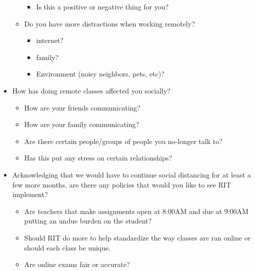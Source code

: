 \documentclass[12pt,
 reprint,
nofootinbib,
 amsmath,amssymb,
 aps,
floatfix,
]{revtex4-2}
\begin{document}
\begin{itemize}
\begin{itemize}
\begin{itemize}
                \item Is this a positive or negative thing for you?
            \end{itemize}
        \item Do you have more distractions when working remotely?
        \begin{itemize}
            \item internet?
            \item family?
            \item Environment (noisy neighbors, pets, etc)?
        \end{itemize}
    \end{itemize}
    \item How has doing remote classes affected you socially?
    \begin{itemize}
        \item How are your friends communicating?
        \item How are your family communicating?
        \item Are there certain people/groups of people you no-longer talk to?
        \item Has this put any stress on certain relationships?
    \end{itemize}
    \item Acknowledging that we would have to continue social distancing for at least a few more months, are there any policies that would you like to see RIT implement?
    \begin{itemize}
        \item Are teachers that make assignments open at 8:00AM and due at 9:00AM putting an undue burden on the student?
        \item Should RIT do more to help standardize the way classes are ran online or should each class be unique.
        \item Are online exams fair or accurate?
    \end{itemize}
\end{itemize}


\newpage



\end{document}
